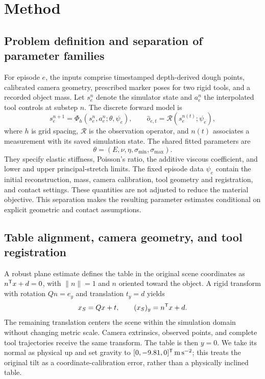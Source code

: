 \section{Method}
\label{sec:method}

\subsection{Problem definition and separation of parameter families}

For episode $e$, the inputs comprise timestamped depth-derived dough points, calibrated camera geometry, prescribed marker poses for two rigid tools, and a recorded object mass. Let $s_e^n$ denote the simulator state and $a_e^n$ the interpolated tool controls at substep $n$. The discrete forward model is
\begin{equation}
 s_e^{n+1}=\Phi_h(s_e^n,a_e^n;\theta,\psi_e),
 \qquad \hat o_{e,t}=\mathcal R(s_e^{n(t)};\psi_e),
 \label{eq:forward}
\end{equation}
where $h$ is grid spacing, $\mathcal R$ is the observation operator, and $n(t)$ associates a measurement with its saved simulation state. The shared fitted parameters are
\begin{equation}
 \theta=(E,\nu,\eta,\sigma_{\min},\sigma_{\max}).
 \label{eq:theta}
\end{equation}
They specify elastic stiffness, Poisson's ratio, the additive viscous coefficient, and lower and upper principal-stretch limits. The fixed episode data $\psi_e$ contain the initial reconstruction, mass, camera calibration, tool geometry and registration, and contact settings. These quantities are not adjusted to reduce the material objective. This separation makes the resulting parameter estimates conditional on explicit geometric and contact assumptions.

\subsection{Table alignment, camera geometry, and tool registration}

A robust plane estimate defines the table in the original scene coordinates as $n^{\mathsf{T}} x+d=0$, with $\|n\|=1$ and $n$ oriented toward the object. A rigid transform with rotation $Qn=e_y$ and translation $t_y=d$ yields
\begin{equation}
 x_S=Qx+t, \qquad (x_S)_y=n^{\mathsf{T}} x+d.
 \label{eq:table}
\end{equation}
The remaining translation centers the scene within the simulation domain without changing metric scale. Camera extrinsics, observed points, and complete tool trajectories receive the same transform. The table is then $y=0$. We take its normal as physical up and set gravity to $[0,-9.81,0]^{\mathsf{T}}\,\mathrm{m\,s^{-2}}$; this treats the original tilt as a coordinate-calibration error, rather than a physically inclined table.

